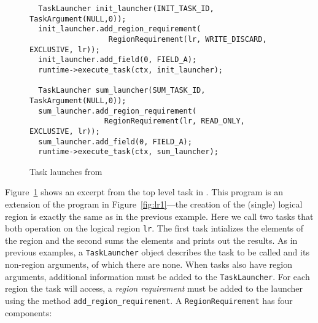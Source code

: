 \begin{figure}
{\small
\begin{lstlisting}
  TaskLauncher init_launcher(INIT_TASK_ID, TaskArgument(NULL,0));
  init_launcher.add_region_requirement(
                  RegionRequirement(lr, WRITE_DISCARD, EXCLUSIVE, lr));
  init_launcher.add_field(0, FIELD_A);
  runtime->execute_task(ctx, init_launcher);

  TaskLauncher sum_launcher(SUM_TASK_ID, TaskArgument(NULL,0));
  sum_launcher.add_region_requirement(
                 RegionRequirement(lr, READ_ONLY, EXCLUSIVE, lr));
  sum_launcher.add_field(0, FIELD_A);
  runtime->execute_task(ctx, sum_launcher);
\end{lstlisting}
}
\caption{Task launches from }
\label{fig:permissions}
\end{figure}


Figure~\ref{fig:permissions} shows an excerpt from the top level task in 
.  This program is an extension of the
program in Figure~\ref{fig:lr1}---the creation of the (single) logical region is exactly the same as in the 
previous example.  Here we call two tasks that both operation on the logical region {\tt lr}. The first
task intializes the elements of the region and the second sums the elements and prints out the results.
As in previous examples, a {\tt TaskLauncher} object describes the task to be called and its non-region arguments,
of which there are none.  When tasks also have region arguments, additional information must be added
to the {\tt TaskLauncher}.
For each region the task will access, a {\em region requirement} must be added to the launcher using the
method {\tt add\_region\_requirement}.  A {\tt RegionRequirement} has four components: 

